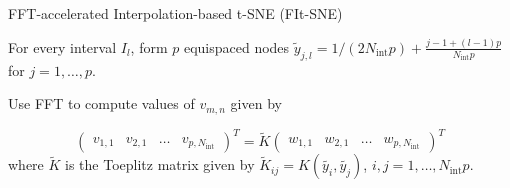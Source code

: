 \begin{algorithm}[H]
    \caption{FFT-accelerated Interpolation-based t-SNE (FIt-SNE)}
    \label{alg:fit-sne}


    For every interval $I_l$, form $p$ equispaced nodes $\tilde{y}_{j, l} = 1/(2N_{\text{int}}p) + \frac{j-1 + (l-1)p}{N_{\text{int}}p}$ for $j=1,\dots,p$. 


    Use FFT to compute values of $v_{m,n}$ given by 

        \[
            \begin{pmatrix}
                v_{1,1} & v_{2,1} & \dots & v_{p, N_{\text{int}}}
            \end{pmatrix}^T = \tilde{K} \begin{pmatrix}
                w_{1,1} & w_{2,1} & \dots & w_{p, N_{\text{int}}}
            \end{pmatrix}^T
        \]
    where $\tilde{K}$ is the Toeplitz matrix given by $\tilde{K}_{ij} = K(\tilde{y_i}, \tilde{y_j})$, $i, j = 1, \dots, N_{\text{int}}p$.
    

\end{algorithm}

